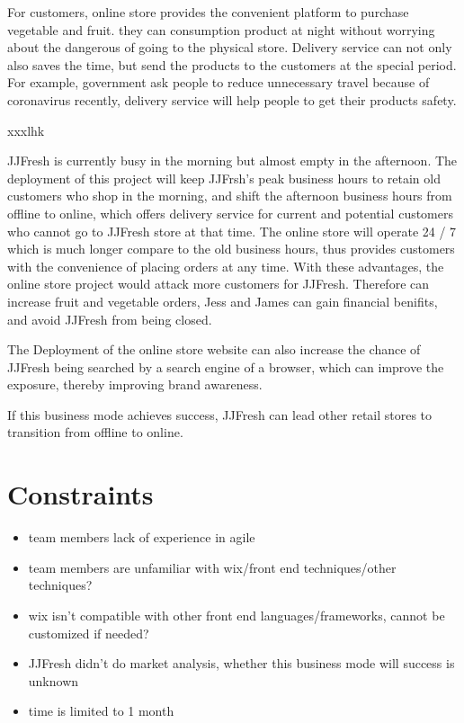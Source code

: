 \documentclass{report}
\begin{document}
For customers, online store provides the convenient platform to purchase vegetable and fruit. they can consumption product at night without worrying about the dangerous of going to the physical store. Delivery service can not only also saves the time, but send the products to the customers at the special period. For example, government ask people to reduce unnecessary travel because of coronavirus recently, delivery service will help people to get their products safety.

xxxlhk

JJFresh is currently busy in the morning but almost empty in the afternoon. The deployment of this project will keep JJFrsh's peak business hours to retain old customers who shop in the morning, and shift the afternoon business hours from offline to online, which offers delivery service for current and potential customers who cannot go to JJFresh store at that time. The online store will operate 24 / 7 which is much longer compare to the old business hours, thus provides customers with the convenience of placing orders at any time. With these advantages, the online store project would attack more customers for JJFresh. Therefore can increase fruit and vegetable orders, Jess and James can gain financial benifits, and avoid JJFresh from being closed.

The Deployment of the online store website can also increase the chance of JJFresh being searched by a search engine of a browser, which can improve the exposure, thereby improving brand awareness.

If this business mode achieves success, JJFresh can lead other retail stores to transition from offline to online.
\section{Constraints}
\begin{itemize}
  \item team members lack of experience in agile
  \item team members are unfamiliar with wix/front end techniques/other techniques?
  \item wix isn't compatible with other front end languages/frameworks, cannot be customized if needed?
  \item JJFresh didn't do market analysis, whether this business mode will success is unknown
  \item time is limited to 1 month
\end{itemize}
\end{document}
